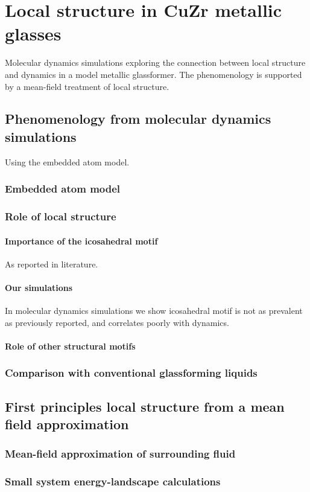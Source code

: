 \documentclass[11pt]{report}
\begin{document}
\chapter{Local structure in CuZr metallic glasses}
Molecular dynamics simulations exploring the connection between local structure and dynamics in a model metallic glassformer.
The phenomenology is supported by a mean-field treatment of local structure.

\section{Phenomenology from molecular dynamics simulations}
Using the embedded atom model.
\subsection{Embedded atom model}
\subsection{Role of local structure}
\subsubsection{Importance of the icosahedral motif}
As reported in literature.
\subsubsection{Our simulations}
In molecular dynamics simulations we show icosahedral motif is not as prevalent as previously reported, and correlates poorly with dynamics.
\subsubsection{Role of other structural motifs}
\subsection{Comparison with conventional glassforming liquids}

\section{First principles local structure from a mean field approximation}
\subsection{Mean-field approximation of surrounding fluid}
\subsection{Small system energy-landscape calculations}
\end{document}
